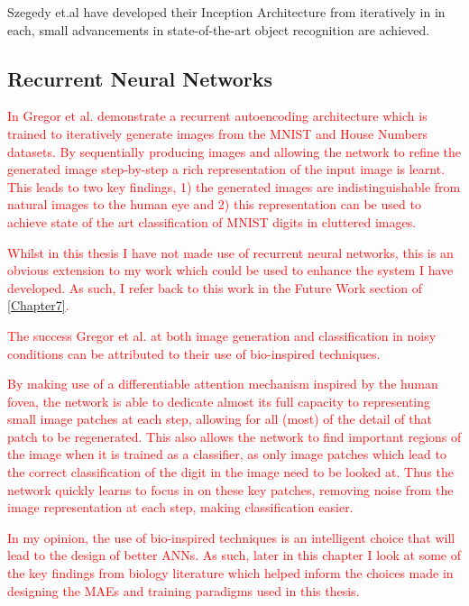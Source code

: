 Szegedy et.al have developed their Inception Architecture from \cite{szegedy2015going} iteratively in \cite{szegedy2016rethinking, szegedy2017inception} in each, small advancements in state-of-the-art object recognition are achieved.

\subsection{Recurrent Neural Networks}
\textcolor{red}{In \cite{gregor2015draw} Gregor et al. demonstrate a recurrent autoencoding architecture which is trained to iteratively generate images from the MNIST \cite{lecun1998mnist} and House Numbers \cite{netzer2011reading} datasets. By sequentially producing images and allowing the network to refine the generated image step-by-step a rich representation of the input image is learnt. This leads to two key findings, 1) the generated images are indistinguishable from natural images to the human eye and 2) this representation can be used to achieve state of the art classification of MNIST digits in cluttered images.}

\textcolor{red}{Whilst in this thesis I have not made use of recurrent neural networks, this is an obvious extension to my work which could be used to enhance the system I have developed. As such, I refer back to this work in the Future Work section of \autoref{Chapter7}.}

\textcolor{red}{The success Gregor et al. at both image generation and classification in noisy conditions can be attributed to their use of bio-inspired techniques.}

\textcolor{red}{By making use of a differentiable attention mechanism inspired by the human fovea, the network is able to dedicate almost its full capacity to representing small image patches at each step, allowing for all (most) of the detail of that patch to be regenerated. This also allows the network to find important regions of the image when it is trained as a classifier, as only image patches which lead to the correct classification of the digit in the image need to be looked at. Thus the network quickly learns to focus in on these key patches, removing noise from the image representation at each step, making classification easier.}

\textcolor{red}{In my opinion, the use of bio-inspired techniques is an intelligent choice that will lead to the design of better \acp{ANN}. As such, later in this chapter I look at some of the key findings from biology literature which helped inform the choices made in designing the \acp{MAE} and training paradigms used in this thesis.} 


